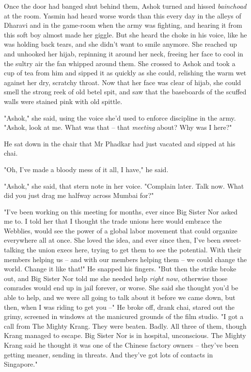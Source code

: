 Once the door had banged shut behind them, Ashok turned and hissed
\emph{bainchoad} at the room. Yasmin had heard worse words than
this every day in the alleys of Dharavi and in the game-room when
the army was fighting, and hearing it from this soft boy almost
made her giggle. But she heard the choke in his voice, like he was
holding back tears, and she didn't want to smile anymore. She
reached up and unhooked her hijab, repinning it around her neck,
freeing her face to cool in the sultry air the fan whipped around
them. She crossed to Ashok and took a cup of tea from him and
sipped it as quickly as she could, relishing the warm wet against
her dry, scratchy throat. Now that her face was clear of hijab, she
could smell the strong reek of old betel spit, and saw that the
baseboards of the scuffed walls were stained pink with old
spittle.

"Ashok," she said, using the voice she'd used to enforce discipline
in the army. "Ashok, look at me. What was that -- that
\emph{meeting} about? Why was I here?"

He sat down in the chair that Mr Phadkar had just vacated and
sipped at his chai.

"Oh, I've made a bloody mess of it all, I have," he said.

"Ashok," she said, that stern note in her voice. "Complain later.
Talk now. What did you just drag me halfway across Mumbai for?"

"I've been working on this meeting for months, ever since Big
Sister Nor asked me to. I told her that I thought the trade unions
here would embrace the Webblies, would see the power of a global
labor movement that could organize everywhere all at once. She
loved the idea, and ever since then, I've been sweet-talking the
union execs here, trying to get them to see the potential. With
their members helping us -- and with our members helping them -- we
could change the world. Change it like that!" He snapped his
fingers. "But then the strike broke out, and Big Sister Nor told me
she needed help \emph{right now}, otherwise those comrades would
end up in jail forever, or worse. She said she thought you'd be
able to help, and we were all going to talk about it before we came
down, but then, when I was riding to get you --" He broke off,
drank chai, stared out the grimy, screened in windows at the
manicured grounds of the film studio. "I got a call from The Mighty
Krang. They were beaten. Badly. All three of them, though Krang
managed to escape. Big Sister Nor is in hospital, unconscious. The
Mighty Krang said he thought it was one of the Chinese factory
owners -- they've been getting meaner, sending in threats. And
they've got lots of contacts in Singapore."

